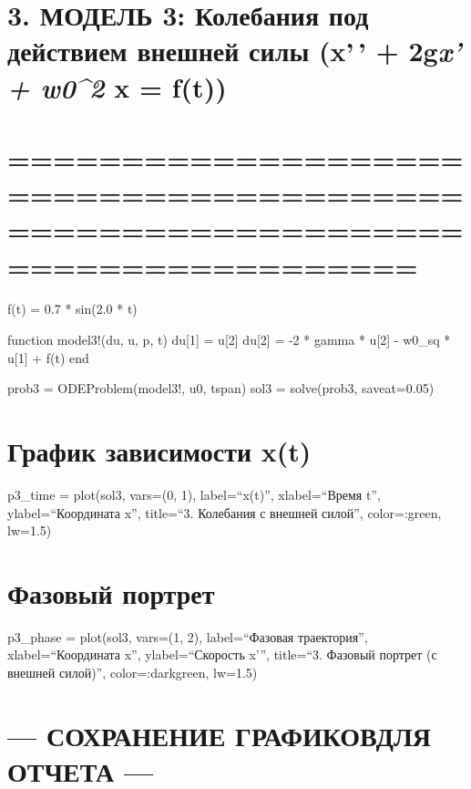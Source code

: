 \documentclass[
  english,
  russian,
  12pt,
  a4paper,
  DIV=11,
  numbers=noendperiod]{scrreprt}
\begin{document}
\chapter{\texorpdfstring{3. МОДЕЛЬ 3: Колебания под действием внешней
силы (x'\,' + 2g\emph{x' + w0\^{}2 } x =
f(t))}{3. МОДЕЛЬ 3: Колебания под действием внешней силы (x'\,' + 2gx' + w0\^{}2  x = f(t))}}\label{ux43cux43eux434ux435ux43bux44c-3-ux43aux43eux43bux435ux431ux430ux43dux438ux44f-ux43fux43eux434-ux434ux435ux439ux441ux442ux432ux438ux435ux43c-ux432ux43dux435ux448ux43dux435ux439-ux441ux438ux43bux44b-x-2gx-w02-x-ft}

\chapter{==============================================================================}\label{section-5}

f(t) = 0.7 * sin(2.0 * t)

function model3!(du, u, p, t) du{[}1{]} = u{[}2{]} du{[}2{]} = -2 *
gamma * u{[}2{]} - w0\_sq * u{[}1{]} + f(t) end

prob3 = ODEProblem(model3!, u0, tspan) sol3 = solve(prob3, saveat=0.05)

\chapter{График зависимости
x(t)}\label{ux433ux440ux430ux444ux438ux43a-ux437ux430ux432ux438ux441ux438ux43cux43eux441ux442ux438-xt-2}

p3\_time = plot(sol3, vars=(0, 1), label=\enquote{x(t)},
xlabel=\enquote{Время t}, ylabel=\enquote{Координата x},
title=\enquote{3. Колебания с внешней силой}, color=:green, lw=1.5)

\chapter{Фазовый
портрет}\label{ux444ux430ux437ux43eux432ux44bux439-ux43fux43eux440ux442ux440ux435ux442-1}

p3\_phase = plot(sol3, vars=(1, 2), label=\enquote{Фазовая траектория},
xlabel=\enquote{Координата x}, ylabel=\enquote{Скорость x'},
title=\enquote{3. Фазовый портрет (с внешней силой)}, color=:darkgreen,
lw=1.5)

\chapter{--- СОХРАНЕНИЕ ГРАФИКОВДЛЯ ОТЧЕТА
---}\label{ux441ux43eux445ux440ux430ux43dux435ux43dux438ux435-ux433ux440ux430ux444ux438ux43aux43eux432ux434ux43bux44f-ux43eux442ux447ux435ux442ux430}
\end{document}
